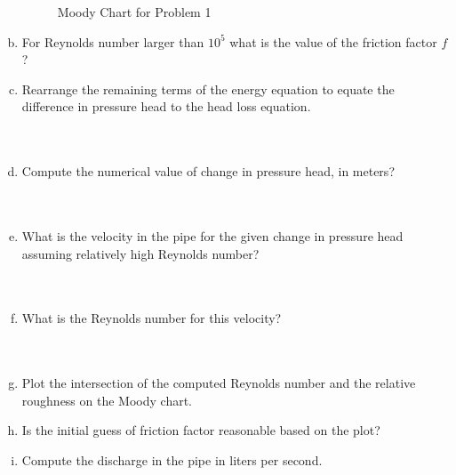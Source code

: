 \documentclass[12pt]{article}
\begin{document}
\begin{enumerate}[a)]
\begin{figure}[h!]
   \caption{Moody Chart for Problem 1}
   \label{fig:Moody Chart} 
\end{figure}
\item For Reynolds number larger than $10^5$ what is the value of the friction factor $f$?\\
\item Rearrange the remaining terms of the energy equation to equate the difference in pressure head to the head loss equation.\\~\\~\\
\item Compute the numerical value of change in pressure head, in meters?\\~\\~\\
\item What is the velocity in the pipe for the given change in pressure head assuming relatively high Reynolds number?\\~\\~\\
\item What is the Reynolds number for this velocity?\\~\\~\\
\item Plot the intersection of the computed Reynolds number and the relative roughness on the Moody chart.\\
\item Is the initial guess of friction factor reasonable based on the plot?\\
\item Compute the discharge in the pipe in liters per second.
\end{enumerate}






\end{document}
